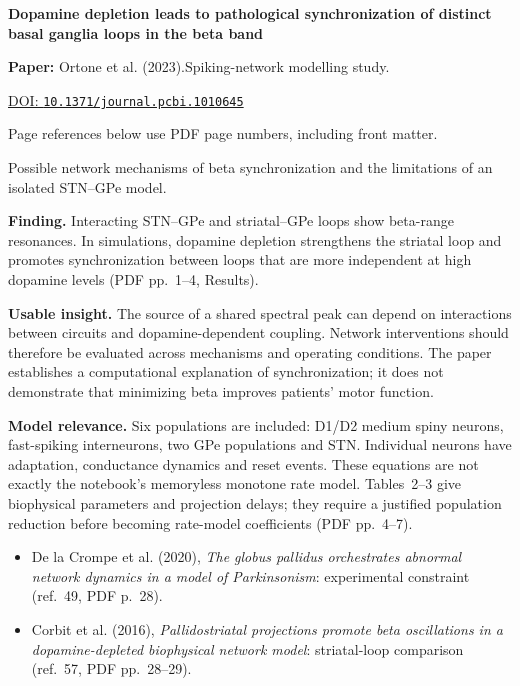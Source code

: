 

{\Large\bfseries Dopamine depletion leads to pathological synchronization of distinct basal ganglia loops in the beta band\par}

\textbf{Paper:} Ortone et al. (2023).\quad Spiking-network modelling study.\par
\href{https://doi.org/10.1371/journal.pcbi.1010645}{DOI: \nolinkurl{10.1371/journal.pcbi.1010645}}\par
{\footnotesize Page references below use PDF page numbers, including front matter.}

Possible network mechanisms of beta synchronization and the limitations of an isolated STN--GPe model.

\textbf{Finding.} Interacting STN--GPe and striatal--GPe loops show beta-range resonances. In simulations, dopamine depletion strengthens the striatal loop and promotes synchronization between loops that are more independent at high dopamine levels (PDF pp.~1--4, Results).

\textbf{Usable insight.} The source of a shared spectral peak can depend on interactions between circuits and dopamine-dependent coupling. Network interventions should therefore be evaluated across mechanisms and operating conditions. The paper establishes a computational explanation of synchronization; it does not demonstrate that minimizing beta improves patients' motor function.

\textbf{Model relevance.} Six populations are included: D1/D2 medium spiny neurons, fast-spiking interneurons, two GPe populations and STN. Individual neurons have adaptation, conductance dynamics and reset events. These equations are not exactly the notebook's memoryless monotone rate model. Tables~2--3 give biophysical parameters and projection delays; they require a justified population reduction before becoming rate-model coefficients (PDF pp.~4--7).

\begin{itemize}
\item De la Crompe et al. (2020), \emph{The globus pallidus orchestrates abnormal network dynamics in a model of Parkinsonism}: experimental constraint (ref.~49, PDF p.~28).
\item Corbit et al. (2016), \emph{Pallidostriatal projections promote beta oscillations in a dopamine-depleted biophysical network model}: striatal-loop comparison (ref.~57, PDF pp.~28--29).
\end{itemize}


